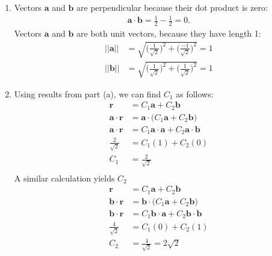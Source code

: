 \item
\begin{enumerate}
\item Vectors $\mathbf{a}$ and $\mathbf{b}$ are perpendicular because their dot product is zero:
\begin{align*}
\mathbf{a} \cdot \mathbf{b} = \frac{1}{2} -  \frac{1}{2} =0.
\end{align*}
Vectors $\mathbf{a}$ and $\mathbf{b}$ are both unit vectors, because they have length 1:
\begin{align*}
|| \mathbf{a} || &=  \sqrt{ \Bigg( \frac{1}{\sqrt{2}}\Bigg)^2 +  \Bigg(\frac{-1}{\sqrt{2}}\Bigg)^2} = 1\\
|| \mathbf{b} || &=  \sqrt{ \Bigg( \frac{1}{\sqrt{2}}\Bigg)^2 +  \Bigg(\frac{1}{\sqrt{2}}\Bigg)^2} = 1
\end{align*}
\item Using results from part (a), we can find $C_1$ as follows:
\begin{align*}
\mathbf{r} &= C_1 \mathbf{a} + C_2  \mathbf{b} \\
\mathbf{a}\cdot\mathbf{r} &=  \mathbf{a}\cdot \Big(C_1 \mathbf{a} + C_2 \mathbf{b} \Big)\\
\mathbf{a}\cdot\mathbf{r} &= C_1 \mathbf{a}\cdot \mathbf{a} + C_2\mathbf{a}\cdot   \mathbf{b} \\
\frac{2}{\sqrt{2}} &= C_1 (1) + C_2(0) \\
C_1 &= \frac{2}{\sqrt{2}} \\
\end{align*}
A similar calculation yields $C_2$
\begin{align*}
\mathbf{r} &= C_1 \mathbf{a} + C_2  \mathbf{b} \\
\mathbf{b}\cdot\mathbf{r} &=  \mathbf{b}\cdot \Big(C_1 \mathbf{a} + C_2 \mathbf{b} \Big)\\
\mathbf{b}\cdot\mathbf{r} &= C_1 \mathbf{b}\cdot \mathbf{a} + C_2\mathbf{b}\cdot   \mathbf{b} \\
\frac{4}{\sqrt{2}} &= C_1 (0) + C_2(1) \\
C_2 &= \frac{4}{\sqrt{2}} = 2\sqrt{2} \\
\end{align*}
\end{enumerate}
